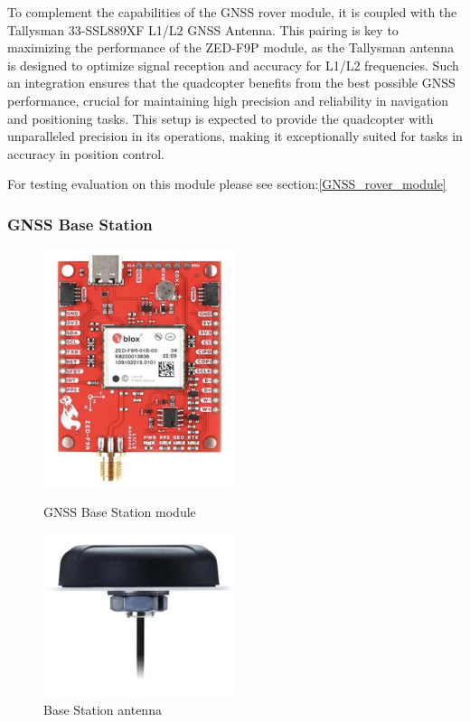 \documentclass{article}
\begin{document}
To complement the capabilities of the GNSS rover module, it is coupled with the Tallysman 33-SSL889XF L1/L2 GNSS Antenna. This pairing is key to maximizing the performance of the ZED-F9P module, as the Tallysman antenna is designed to optimize signal reception 
and accuracy for L1/L2 frequencies. Such an integration ensures that the quadcopter benefits from the best possible GNSS performance, crucial for maintaining high precision and reliability in navigation and positioning tasks. This setup is expected to provide 
the quadcopter with unparalleled precision in its operations, making it exceptionally suited for tasks in accuracy in position control.

For testing evaluation on this module please see section:\ref{GNSS_rover_module}

\subsubsection{GNSS Base Station}
\begin{figure}[H]
  \begin{minipage}{0.5\textwidth}
    \centering
    \includegraphics[width=0.5\textwidth]{Pictures/gnss_base_station.png}
    \caption{GNSS Base Station module}
    \label{fig:gnss_base_station}
  \end{minipage}
  \begin{minipage}{0.5\textwidth}
    \centering
    \includegraphics[width=0.5\textwidth]{Pictures/base_station_antenna.png}
    \caption{Base Station antenna}
    \label{fig:base_station_antenna}
  \end{minipage}
\end{figure}
\end{document}
